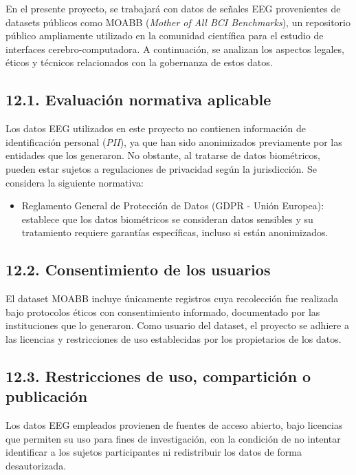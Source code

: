 \documentclass[
11pt, %
]{charter}
\begin{document}
En el presente proyecto, se trabajará con datos de señales EEG provenientes de datasets públicos como MOABB (\textit{Mother of All BCI Benchmarks}), un repositorio público ampliamente utilizado en la comunidad científica para el estudio de interfaces cerebro-computadora. A continuación, se analizan los aspectos legales, éticos y técnicos relacionados con la gobernanza de estos datos.

\subsection*{12.1. Evaluación normativa aplicable}

Los datos EEG utilizados en este proyecto no contienen información de identificación personal (\textit{PII}), ya que han sido anonimizados previamente por las entidades que los generaron. No obstante, al tratarse de datos biométricos, pueden estar sujetos a regulaciones de privacidad según la jurisdicción. Se considera la siguiente normativa:

\begin{itemize}
  \item Reglamento General de Protección de Datos (GDPR - Unión Europea): establece que los datos biométricos se consideran datos sensibles y su tratamiento requiere garantías específicas, incluso si están anonimizados.
\end{itemize}

\subsection*{12.2. Consentimiento de los usuarios}

El dataset MOABB incluye únicamente registros cuya recolección fue realizada bajo protocolos éticos con consentimiento informado, documentado por las instituciones que lo generaron. Como usuario del dataset, el proyecto se adhiere a las licencias y restricciones de uso establecidas por los propietarios de los datos.

\subsection*{12.3. Restricciones de uso, compartición o publicación}

Los datos EEG empleados provienen de fuentes de acceso abierto, bajo licencias que permiten su uso para fines de investigación, con la condición de no intentar identificar a los sujetos participantes ni redistribuir los datos de forma desautorizada.
\end{document}
